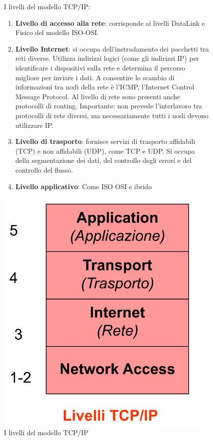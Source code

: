 \begin{figure}[h!]
    \begin{minipage}{0.55\textwidth}
        I livelli del modello TCP/IP:
        \begin{enumerate}
            \item \textbf{Livello di accesso alla rete}: corrisponde ai livelli DataLink e Fisico del modello ISO-OSI.
            \item \textbf{Livello Internet}: si occupa dell'instradamento dei pacchetti tra reti diverse. Utilizza indirizzi logici (come gli indirizzi IP) per identificare i dispositivi sulla rete e determina il percorso migliore per inviare i dati.
            A consentire lo scambio di informazioni tra nodi della rete è l'ICMP, l'Internet Control Message Protocol. Al livello di rete sono presenti anche protocolli di routing. 
            Importante: non prevede l'interlavoro tra protocolli di rete
            diversi, ma necessariamente tutti i nodi devono
            utilizzare IP.
            \item \textbf{Livello di trasporto}: fornisce servizi di trasporto affidabili (TCP) e non affidabili (UDP), come TCP e UDP. Si occupa della segmentazione dei dati, del controllo degli errori e del controllo del flusso.
            \item \textbf{Livello applicativo}: Come ISO OSI e ibrido
        \end{enumerate}
    \end{minipage}\hfill
    \begin{minipage}{0.4\textwidth}
        \centering
        \includegraphics[width=0.95\textwidth]{images/modello_TCP_IP.png}
        \caption{I livelli del modello TCP/IP}
        \label{fig:tcp_ip_modello}
    \end{minipage}
\end{figure}


